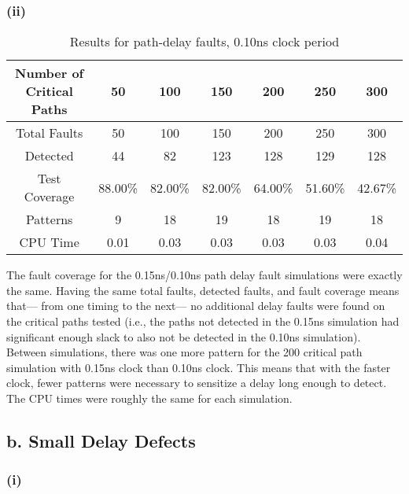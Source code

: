\documentclass[letterpaper]{article} %
\begin{document}
\subsubsection*{(ii)}

\begin{table}[ht]
\centering
\begin{tabular}{|c|c|c|c|c|c|c|}
\hline
Number of Critical Paths & 50      & 100     & 150     & 200     & 250     & 300     \\ \hline
Total Faults             & 50      & 100     & 150     & 200     & 250     & 300     \\ \hline
Detected                 & 44      & 82      & 123     & 128     & 129     & 128     \\ \hline
Test Coverage            & 88.00\% & 82.00\% & 82.00\% & 64.00\% & 51.60\% & 42.67\% \\ \hline
Patterns                 & 9       & 18      & 19      & 18      & 19      & 18      \\ \hline
CPU Time                 & 0.01    & 0.03    & 0.03    & 0.03    & 0.03    & 0.04    \\ \hline
\end{tabular}
\caption{Results for path-delay faults, 0.10ns clock period}
\end{table}
The fault coverage for the 0.15ns/0.10ns path delay fault simulations were exactly the same. Having the same total faults, detected faults, and fault coverage means that--- from one timing to the next--- no additional delay faults were found on the critical paths tested (i.e., the paths not detected in the 0.15ns simulation had significant enough slack to also not be detected in the 0.10ns simulation). Between simulations, there was one more pattern for the 200 critical path simulation with 0.15ns clock than 0.10ns clock. This means that with the faster clock, fewer patterns were necessary to sensitize a delay long enough to detect. The CPU times were roughly the same for each simulation.

\subsection*{b. Small Delay Defects}
\subsubsection*{(i)}
\end{document}
